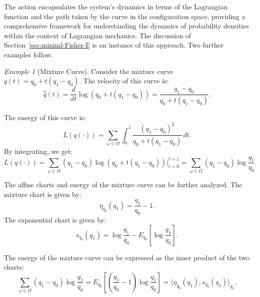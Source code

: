 \documentclass[axioms,article,submit,pdftex,moreauthors]{Definitions/mdpi}
\theoremstyle{plain}
\theoremstyle{remark}
\newtheorem{myexample}{Example}
\begin{document}
The action encapsulates the system's dynamics in terms of the Lagrangian function and the path taken by the curve in the configuration space, providing a comprehensive framework for understanding the dynamics of probability densities within the context of Lagrangian mechanics. The discussion of Section~\ref{sec:miniml-Fisher-I} is an instance of this approach. Two further examples follow.

\begin{myexample}[Mixture Curve] Consider the mixture curve \( q(t) = q_0 + t(q_1 - q_0) \). The velocity of this curve is:
\begin{equation*} 
\overset{\star}{q}(t) = \frac{d}{dt} \log (q_0 + t(q_1 - q_0)) = \frac{q_1 - q_0}{q_0 + t(q_1 - q_0)}.
\end{equation*} 

The energy of this curve is:
\begin{equation*} 
L(q(\cdot)) = \sum_{\omega \in \Omega} \int_0^1 \frac{(q_1 - q_0)^2}{q_0 + t(q_1 - q_0)} \, dt.
\end{equation*} 
By integrating, we get:
\begin{equation*} 
L(q(\cdot)) = \sum_{\omega \in \Omega} (q_1 - q_0) \log (q_0 + t(q_1 - q_0)) \bigg|_{t=0}^{t=1} = \sum_{\omega \in \Omega} (q_1 - q_0) \log \frac{q_1}{q_0}.
\end{equation*} 

The affine charts and energy of the mixture curve can be further analyzed. The mixture chart is given by:
\begin{equation*} 
\eta_{q_0}(q_1) = \frac{q_1}{q_0} - 1.
\end{equation*} 
The exponential chart is given by:
\begin{equation*} 
s_{q_0}(q_1) = \log \frac{q_1}{q_0} - E_{q_0} \left[ \log \frac{q_1}{q_0} \right].
\end{equation*} 

The energy of the mixture curve can be expressed as the inner product of the two charts:
\begin{equation*} 
\sum_{\omega \in \Omega} (q_1 - q_0) \log \frac{q_1}{q_0} = E_{q_0} \left[ \left( \frac{q_1}{q_0} - 1 \right) \log \frac{q_1}{q_0} \right] = \langle \eta_{q_0}(q_1), s_{q_0}(q_1) \rangle_{q_0}.
\end{equation*} 
\end{myexample}
\end{document}

